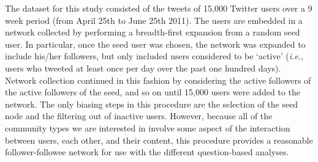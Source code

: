 The dataset for this study consisted of the tweets of 15,000 Twitter users over a 9 week period (from April 25th to June 25th 2011). The users are embedded in a network collected by performing a breadth-first expansion from a random seed user. In particular, once the seed user was chosen, the network was expanded to include his/her followers, but only included users considered to be `active' ({\it i.e.,} users who tweeted at least once per day over the past one hundred days). Network collection continued in this fashion by considering the active followers of the active followers of the seed, and so on until 15,000 users were added to the network. The only biasing steps in this procedure are the selection of the seed node and the filtering out of inactive users. However, because all of the community types we are interested in involve some aspect of the interaction between users, each other, and their content, this procedure provides a reasonable follower-followee network for use with the different question-based analyses.

